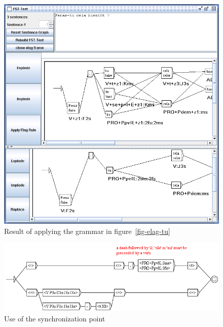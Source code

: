 \begin{figure}[!ht]
\begin{center}
\includegraphics[width=14cm]{resources/img/fig7-13.png}
\caption{Result of applying the grammar in figure~\ref{fig-elag-tu}
\label{fig-applying-tu-grammar}}
\end{center}
\end{figure}

\begin{figure}[!ht]
\begin{center}
\includegraphics[width=14cm]{resources/img/fig7-14.png}
\caption{Use of the synchronization point\label{fig-synchronization-point}}
\end{center}
\end{figure}

